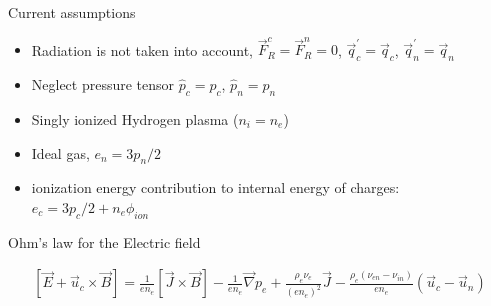\documentclass{beamer}
\begin{document}
\begin{frame}{Current assumptions}

\begin{itemize}

\item Radiation is not taken into account, $\vec{F}_R^c=\vec{F}_R^n=0$, $\vec{q}_{c}^{\prime} = \vec{q}_{c} $, $\vec{q}_{n}^{\prime} = \vec{q}_{n} $

\item Neglect pressure tensor $\hat{p}_c=p_c$, $\hat{p}_n=p_n$

\item Singly ionized Hydrogen plasma ($n_i = n_e$)

\item Ideal gas, $e_n=3p_n/2$

\item ionization energy contribution to internal energy of charges: $e_c = 3p_c/2+ n_e \phi_{ion}$

\end{itemize}

Ohm's law for the Electric field

\begin{eqnarray} \nonumber
[\vec{E} + \vec{u}_c\times{\vec{B}}] = \frac{1}{en_e}[\vec{J}\times \vec{B}] -  \frac{1}{e n_e}\vec{\nabla}{p_e} + \frac{\rho_e\nu_e}{(en_e)^2}\vec{J}  - \frac{\rho_e(\nu_{en} - \nu_{in})}{en_e}(\vec{u}_c - \vec{u}_n) 
\end{eqnarray}

\end{frame}
\end{document}
